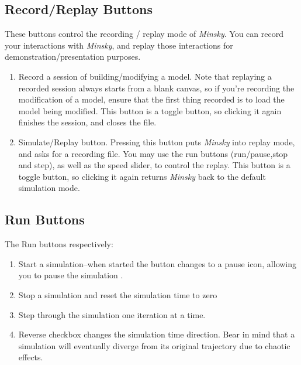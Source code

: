 \subsection{Record/Replay Buttons}

\label{RecReplayButtons}


These buttons control the recording / replay mode of \emph{Minsky}.
You can record your interactions with \emph{Minsky}, and replay those
interactions for demonstration/presentation purposes.
\begin{enumerate}
\item Record a session of building/modifying a model. Note that replaying
a recorded session always starts from a blank canvas, so if you're
recording the modification of a model, ensure that the first thing
recorded is to load the model being modified. This button is a toggle
button, so clicking it again finishes the session, and closes the
file. 
\item Simulate/Replay button. Pressing this button puts \emph{Minsky} into
replay mode, and asks for a recording file. You may use the run buttons
(run/pause,stop and step), as well as the speed slider, to control
the replay. This button is a toggle button, so clicking it again returns
\emph{Minsky} back to the default simulation mode. 
\end{enumerate}

\subsection{Run Buttons}

\label{RunButtons}


The Run buttons respectively: 
\begin{enumerate}
\item Start a simulation--when started the button changes to a pause icon,
allowing you to pause the simulation . 
\item Stop a simulation and reset the simulation time to zero 
\item Step through the simulation one iteration at a time. 
\item Reverse checkbox changes the simulation time direction. Bear in mind
that a simulation will eventually diverge from its original trajectory
due to chaotic effects. 
\end{enumerate}

